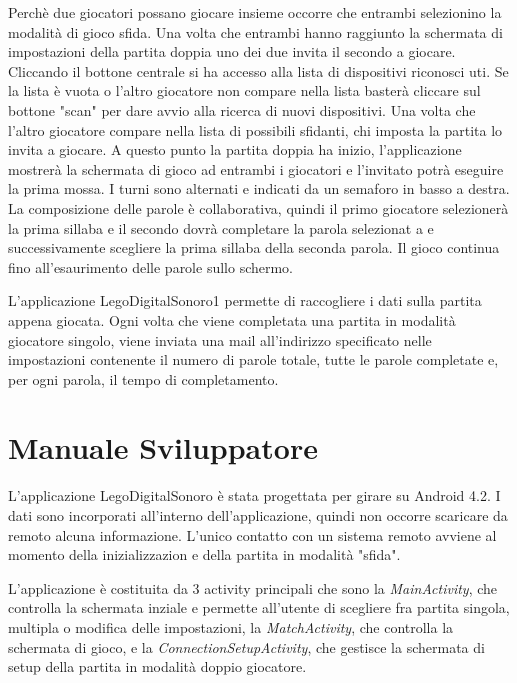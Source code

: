 Perchè due giocatori possano giocare insieme occorre che entrambi selezionino la modalità di gioco sfida. Una volta che entrambi hanno raggiunto la schermata di impostazioni della partita doppia uno dei due invita il secondo a giocare. Cliccando il bottone centrale si ha accesso alla lista di dispositivi riconosci uti. Se la lista è vuota o l'altro giocatore non compare nella lista basterà cliccare sul bottone "scan" per dare avvio alla ricerca di nuovi dispositivi. Una volta che l'altro giocatore compare nella lista di possibili sfidanti, chi imposta la partita lo invita a giocare. A questo punto la partita doppia ha inizio, l'applicazione mostrerà la schermata di gioco ad entrambi i giocatori e l'invitato potrà eseguire la prima mossa. I turni sono alternati e indicati da un semaforo in basso a destra. La composizione delle parole è collaborativa, quindi il primo giocatore selezionerà la prima sillaba e il secondo dovrà completare la parola selezionat a e successivamente scegliere la prima sillaba della seconda parola. Il gioco continua fino all'esaurimento delle parole sullo schermo.



L'applicazione LegoDigitalSonoro1 permette di raccogliere i dati sulla partita appena giocata. Ogni volta che viene completata una partita in modalità giocatore singolo, viene inviata una mail all'indirizzo specificato nelle impostazioni contenente il numero di parole totale, tutte le parole completate e, per ogni parola, il tempo di completamento.

\section{Manuale Sviluppatore}

L'applicazione LegoDigitalSonoro è stata progettata per girare su Android 4.2. I dati sono incorporati all'interno dell'applicazione, quindi non occorre scaricare da remoto alcuna informazione. L'unico contatto con un sistema remoto avviene al momento della inizializzazion e della partita in modalità "sfida".

L'applicazione è costituita da 3 activity principali che sono la \emph{MainActivity}, che controlla la schermata inziale e permette all'utente di scegliere fra partita singola, multipla o modifica delle impostazioni, la \emph{MatchActivity}, che controlla la schermata di gioco, e la \emph{ConnectionSetupActivity}, che gestisce la schermata di setup della partita in modalità doppio giocatore.

